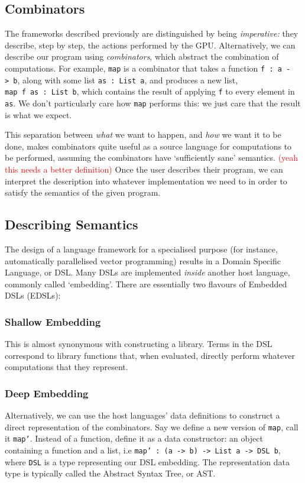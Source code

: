 \documentclass[a4paper,12pt]{article}
\newcommand{\red}[1]{\textcolor{red}{#1}}
\newcommand{\icf}[1]{\mbox{\texttt{#1}}}
\begin{document}
\subsection{Combinators}
The frameworks described previously are distinguished by being \textit{imperative:} they describe, step by step, the actions performed by the GPU.
Alternatively, we can describe our program using \textit{combinators}, which abstract the combination of computations. 
For example, \icf{map} is a combinator that takes a function \icf{f\ :\  a\ ->\ b}, along with some list \icf{as\ :\ List\ a}, and produces a new list, \icf{map\ f\ as\ :\ List\ b}, which contains the result of applying \icf{f} to every element in \icf{as}. 
We don't particularly care how \icf{map} performs this: we just care that the result is what we expect.

This separation between \textit{what} we want to happen, and \textit{how} we want it to be done, makes combinators quite useful as a source language for computations to be performed, assuming the combinators have `sufficiently sane' semantics. 
\red{(yeah this needs a better definition)} 
Once the user describes their program, we can interpret the description into whatever implementation we need to in order to satisfy the semantics of the given program.

\subsection{Describing Semantics}
The design of a language framework for a specialised purpose (for instance, automatically parallelised vector programming) results in a Domain Specific Language, or DSL. 
Many DSLs are implemented \textit{inside} another host language, commonly called `embedding'. There are essentially two flavours of Embedded DSLs (EDSLs):

\subsubsection{Shallow Embedding} 
This is almost synonymous with constructing a library. 
Terms in the DSL correspond to library functions that, when evaluated, directly perform whatever computations that they represent.

\subsubsection{Deep Embedding} 
Alternatively, we can use the host languages' data definitions to construct a direct representation of the combinators. 
Say we define a new version of \icf{map}, call it \icf{map'}.
Instead of a function, define it as a data constructor: an object containing a function and a list, i.e \texttt{map'\ :\ (a\ ->\ b)\ ->\ List\ a\ ->\ DSL\ b}, where \icf{DSL} is a type representing our DSL embedding. 
The representation data type is typically called the Abstract Syntax Tree, or AST.
\end{document}
